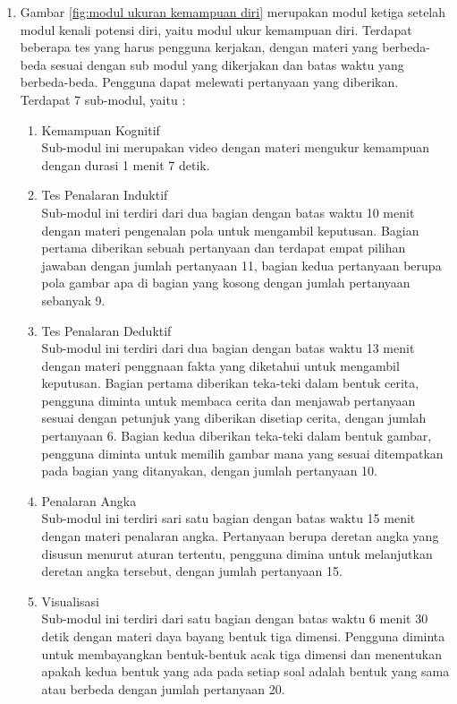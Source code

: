 \begin{enumerate}
    \item Gambar \ref{fig:modul ukuran kemampuan diri} merupakan modul ketiga setelah modul kenali potensi diri, yaitu modul ukur kemampuan diri. Terdapat beberapa tes yang harus pengguna kerjakan, dengan materi yang berbeda-beda sesuai dengan sub modul yang dikerjakan dan batas waktu yang berbeda-beda. Pengguna dapat melewati pertanyaan yang diberikan. Terdapat 7 sub-modul, yaitu :
    
    \begin{enumerate}
        \item Kemampuan Kognitif \\
             Sub-modul ini merupakan video dengan materi mengukur kemampuan dengan durasi 1 menit 7 detik.
             
        \item Tes Penalaran Induktif \\
            Sub-modul ini terdiri dari dua bagian dengan batas waktu 10 menit dengan materi pengenalan pola untuk mengambil keputusan. Bagian pertama diberikan sebuah pertanyaan dan terdapat empat pilihan jawaban dengan jumlah pertanyaan 11, bagian kedua pertanyaan berupa pola gambar apa di bagian yang kosong dengan jumlah pertanyaan sebanyak 9. 
        
        \item Tes Penalaran Deduktif \\
            Sub-modul ini terdiri dari dua bagian dengan batas waktu 13 menit dengan materi penggnaan fakta yang diketahui untuk mengambil keputusan. Bagian pertama diberikan teka-teki dalam bentuk cerita, pengguna diminta untuk membaca cerita dan menjawab pertanyaan sesuai dengan petunjuk yang diberikan disetiap cerita, dengan jumlah pertanyaan 6. Bagian kedua diberikan teka-teki dalam bentuk gambar, pengguna diminta untuk memilih gambar mana yang sesuai ditempatkan pada bagian yang ditanyakan, dengan jumlah pertanyaan 10.
        
        
        \item Penalaran Angka \\
            Sub-modul ini terdiri sari satu bagian dengan batas waktu 15 menit dengan materi penalaran angka. Pertanyaan berupa deretan angka yang disusun menurut aturan tertentu, pengguna dimina untuk melanjutkan deretan angka tersebut, dengan jumlah pertanyaan 15.
            
        \item Visualisasi \\
            Sub-modul ini terdiri dari satu bagian dengan batas waktu 6 menit 30 detik dengan materi daya bayang bentuk tiga dimensi. Pengguna diminta untuk membayangkan bentuk-bentuk acak tiga dimensi dan menentukan apakah kedua bentuk yang ada pada setiap soal adalah bentuk yang sama atau berbeda dengan jumlah pertanyaan 20.
            

\end{enumerate}
\end{enumerate}
